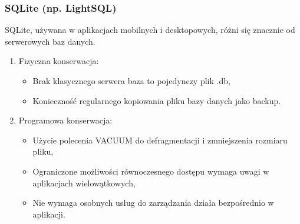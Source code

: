 \documentclass[letterpaper,10pt,polish]{sphinxmanual}
\begin{document}
\subsubsection{SQLite (np. LightSQL)}
\label{\detokenize{rozdzial2/Kontrola_i_konserwacja/kontrola_i_konserwacja:sqlite-np-lightsql}}
\sphinxAtStartPar
SQLite, używana w aplikacjach mobilnych i desktopowych, różni się znacznie od serwerowych baz danych.
\begin{enumerate}
%
\item {} 
\sphinxAtStartPar
Fizyczna konserwacja:
\begin{itemize}
\item {} 
\sphinxAtStartPar
Brak klasycznego serwera \textendash{} baza to pojedynczy plik .db,

\item {} 
\sphinxAtStartPar
Konieczność regularnego kopiowania pliku bazy danych jako backup.

\end{itemize}

\item {} 
\sphinxAtStartPar
Programowa konserwacja:
\begin{itemize}
\item {} 
\sphinxAtStartPar
Użycie polecenia VACUUM do defragmentacji i zmniejszenia rozmiaru pliku,

\item {} 
\sphinxAtStartPar
Ograniczone możliwości równoczesnego dostępu \textendash{} wymaga uwagi w aplikacjach wielowątkowych,

\item {} 
\sphinxAtStartPar
Nie wymaga osobnych usług do zarządzania \textendash{} działa bezpośrednio w aplikacji.

\end{itemize}

\end{enumerate}
\end{document}
